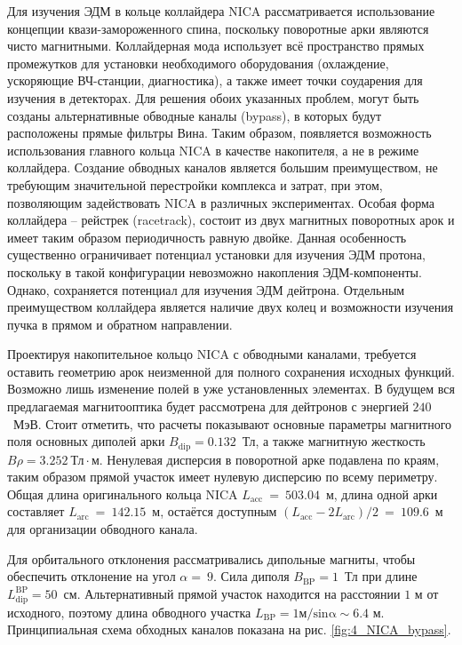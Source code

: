 \par Для изучения ЭДМ в кольце коллайдера NICA рассматривается использование концепции квази-замороженного спина, поскольку поворотные арки являются чисто магнитными. Коллайдерная мода использует всё пространство прямых промежутков для установки необходимого оборудования (охлаждение, ускоряющие ВЧ-станции, диагностика), а также имеет точки соударения для изучения в детекторах. Для решения обоих указанных проблем, могут быть созданы альтернативные обводные каналы (bypass), в которых будут расположены прямые фильтры Вина. Таким образом, появляется возможность использования главного кольца NICA в качестве накопителя, а не в режиме коллайдера. Создание обводных каналов является большим преимуществом, не требующим значительной перестройки комплекса и затрат, при этом, позволяющим задействовать NICA в различных экспериментах. Особая форма коллайдера -- рейстрек (racetrack), состоит из двух магнитных поворотных арок и имеет таким образом периодичность равную двойке. Данная особенность существенно ограничивает потенциал установки для изучения ЭДМ протона, поскольку в такой конфигурации невозможно накопления ЭДМ-компоненты. Однако, сохраняется потенциал для изучения ЭДМ дейтрона. Отдельным преимуществом коллайдера является наличие двух колец и возможности изучения пучка в прямом и обратном направлении.

\par Проектируя накопительное кольцо NICA с обводными каналами, требуется оставить геометрию арок неизменной для полного сохранения исходных функций. Возможно лишь изменение полей в уже установленных элементах. В будущем вся предлагаемая магнитооптика будет рассмотрена для дейтронов с энергией $240$~МэВ. Стоит отметить, что расчеты показывают основные параметры магнитного поля основных диполей арки $B_{\textrm{dip}}=0.132$~Тл, а также магнитную жесткость $B\rho=3.252 \ \textrm{Тл} \cdot$м. Ненулевая дисперсия в поворотной арке подавлена по краям, таким образом прямой участок имеет нулевую дисперсию по всему периметру. Общая длина оригинального кольца NICA $L_{\textrm{acc}}~=~503.04$~м, длина одной арки составляет $L_{\textrm{arc}}~=~142.15$~м, остаётся доступным $\left(L_{\textrm{acc}}-2L_{\textrm{arc}}\right)/2~=~109.6$~м для организации обводного канала.

\par Для орбитального отклонения рассматривались дипольные магниты, чтобы обеспечить отклонение на угол $\alpha=\ 9$. Сила диполя $B_{\textrm{BP}}=1$~Тл при длине $L_{\textrm{dip}}^{\textrm{BP}}=50$~см. Альтернативный прямой участок находится на расстоянии $1$ м от исходного, поэтому длина обводного участка $L_{\textrm{BP}}=1\mathrm{м/sin\alpha}\sim6.4$ м. Принципиальная схема обходных каналов показана на рис. \ref{fig:4_NICA_bypass}.

